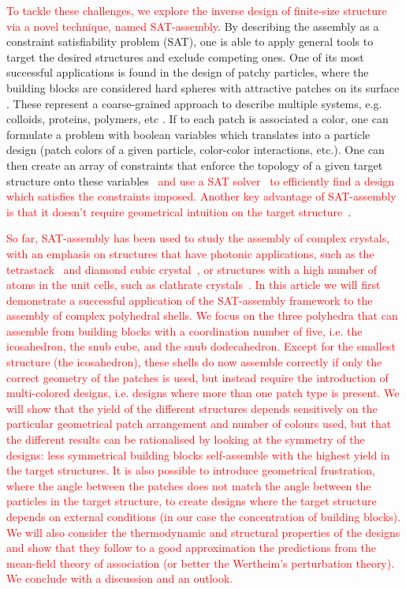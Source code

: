 \documentclass[a4paper, amsfonts, amssymb, amsmath, reprint, showkeys, nofootinbib, twoside]{revtex4-1}
\begin{document}
\textcolor{red}{To tackle these challenges, we explore the inverse design of finite-size structure via a novel technique, named SAT-assembly\cite{Romano2020a,Russo2022}}. By describing the assembly as a constraint satisfiability problem (SAT), one is able to apply general tools to target the desired structures and exclude competing ones. One of its most successful applications is found in the design of patchy particles, where the building blocks are considered hard spheres with attractive patches on its surface \cite{Bianchi2006, Romano2010, Rovigatti2018, Russo2021, Sciortino2009}. These represent a coarse-grained approach to describe multiple systems, e.g. colloids, proteins, polymers, etc \cite{Sacanna2011, Wang2012}. If to each patch is associated a color, one can formulate a problem with boolean variables which translates into a particle design (patch colors of a given particle, color-color interactions, etc.). One can then create an array of constraints that enforce the topology of a given target structure onto these variables~\cite{Russo2022} \textcolor{red}{ and use a SAT solver~\cite{Een2005} to efficiently find a design which satisfies the constraints imposed.}
\textcolor{red}{Another key advantage of SAT-assembly is that it doesn't require geometrical intuition on the target structure~\cite{rapaport2004self}}.


\textcolor{red}{So far, SAT-assembly has been used to study the assembly of complex crystals, with an emphasis on structures that have photonic applications, such as the tetrastack~\cite{Romano2020a} and diamond cubic crystal~\cite{Romano2020a,Russo2022,rovigatti2022simple}, or structures with a high number of atoms in the unit cells, such as clathrate crystals~\cite{Romano2020a}. In this article we will first demonstrate a successful application of the SAT-assembly framework to the assembly of complex polyhedral shells. We focus on the three polyhedra that can assemble from building blocks with a  coordination number of five, i.e. the icosahedron, the snub cube, and the snub dodecahedron. Except for the smallest structure (the icosahedron), these shells do now assemble correctly if only the correct geometry of the patches is used, but instead require the introduction of multi-colored designs, i.e. designs where more than one patch type is present. We will show that the yield of the different structures depends sensitively on the particular geometrical patch arrangement and number of colours used, but that the different results can be rationalised by looking at the symmetry of the designs: less symmetrical building blocks self-assemble with the highest yield in the target structures. It is also possible to introduce geometrical frustration, where the angle between the patches does not match the angle between the particles in the target structure, to create designs where the target structure depends on external conditions (in our case the concentration of building blocks). We will also consider the thermodynamic and structural properties of the designs and show that they follow to a good approximation the predictions from the mean-field theory of association (or better the Wertheim's perturbation theory). We conclude with a discussion and an outlook.}
\end{document}
